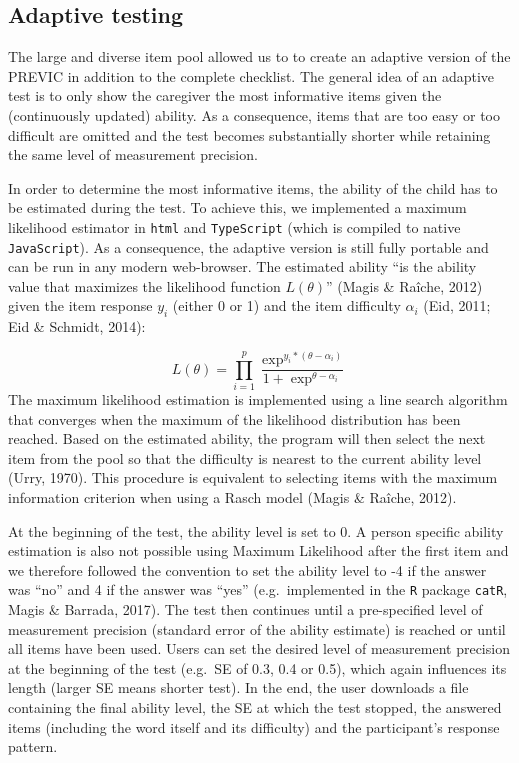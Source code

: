 \documentclass[
  man,floatsintext]{apa6}
\begin{document}
\hypertarget{adaptive-testing}{%
\subsection{Adaptive testing}\label{adaptive-testing}}

The large and diverse item pool allowed us to to create an adaptive version of the PREVIC in addition to the complete checklist. The general idea of an adaptive test is to only show the caregiver the most informative items given the (continuously updated) ability. As a consequence, items that are too easy or too difficult are omitted and the test becomes substantially shorter while retaining the same level of measurement precision.

In order to determine the most informative items, the ability of the child has to be estimated during the test. To achieve this, we implemented a maximum likelihood estimator in \texttt{html} and \texttt{TypeScript} (which is compiled to native \texttt{JavaScript}). As a consequence, the adaptive version is still fully portable and can be run in any modern web-browser. The estimated ability ``is the ability value that maximizes the likelihood function \(L(\theta)\)'' (Magis \& Raîche, 2012) given the item response \(y_i\) (either 0 or 1) and the item difficulty \(\alpha_i\) (Eid, 2011; Eid \& Schmidt, 2014):

\[
L(\theta) = \prod_{i = 1}^{p} \frac{\exp^{y_i * (\theta - \alpha_i)}}{1 + \exp^{\theta - \alpha_i}}
\] The maximum likelihood estimation is implemented using a line search algorithm that converges when the maximum of the likelihood distribution has been reached. Based on the estimated ability, the program will then select the next item from the pool so that the difficulty is nearest to the current ability level (Urry, 1970). This procedure is equivalent to selecting items with the maximum information criterion when using a Rasch model (Magis \& Raîche, 2012).

At the beginning of the test, the ability level is set to 0. A person specific ability estimation is also not possible using Maximum Likelihood after the first item and we therefore followed the convention to set the ability level to -4 if the answer was ``no'' and 4 if the answer was ``yes'' (e.g.~implemented in the \texttt{R} package \texttt{catR}, Magis \& Barrada, 2017). The test then continues until a pre-specified level of measurement precision (standard error of the ability estimate) is reached or until all items have been used. Users can set the desired level of measurement precision at the beginning of the test (e.g.~SE of 0.3, 0.4 or 0.5), which again influences its length (larger SE means shorter test). In the end, the user downloads a file containing the final ability level, the SE at which the test stopped, the answered items (including the word itself and its difficulty) and the participant's response pattern.
\end{document}
